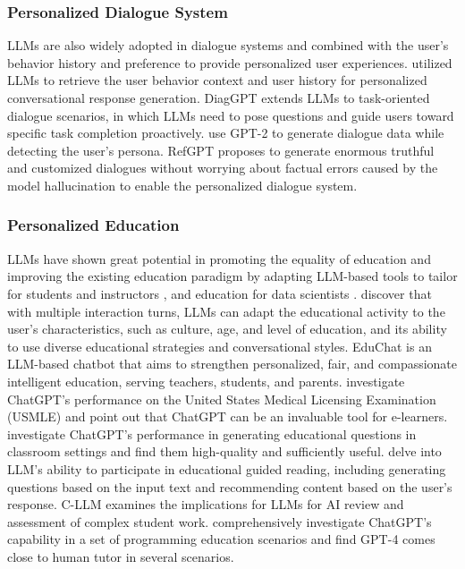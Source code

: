 \documentclass[11pt]{article}
\begin{document}
\subsubsection{Personalized Dialogue System}
LLMs are also widely adopted in dialogue systems and combined with the user's behavior history and preference to provide personalized user experiences.  
\citet{hudevcek2023llms} utilized LLMs to retrieve the user behavior context and user history for personalized conversational response generation.
DiagGPT \cite{cao2023diaggpt} extends LLMs to task-oriented dialogue scenarios, in which LLMs need to pose questions and guide users toward specific task completion proactively.
\citet{cho2022personalized} use GPT-2 to generate dialogue data while detecting the user's persona. 
 RefGPT \cite{yang2023refgpt} proposes to generate enormous truthful and customized dialogues without worrying about factual errors caused by the model hallucination to enable the personalized dialogue system.


\subsubsection{Personalized Education}
\label{sec:per_edu}
LLMs have shown great potential in promoting the equality of education and improving the existing education paradigm by adapting LLM-based tools to tailor for students and instructors \cite{joshi2023let, yan2023practical}, and education for data scientists \cite{tu2023should}. \citet{koyuturk2023developing} discover that with multiple interaction turns, LLMs can adapt the educational activity to the user's characteristics, such as culture, age, and level of education, and its ability to use diverse educational strategies and conversational styles. EduChat \cite{dan2023educhat} is an LLM-based chatbot that aims to strengthen personalized, fair, and compassionate intelligent education, serving teachers, students, and parents. \citet{sharma2023performance} investigate ChatGPT's performance on the United States Medical Licensing Examination (USMLE) and point out that ChatGPT can be an invaluable tool for e-learners. \citet{elkins2023useful} investigate ChatGPT's performance in generating educational questions in classroom settings and find them high-quality and sufficiently useful. \citet{ochieng2023large} delve into LLM's ability to participate in educational guided reading, including generating questions based on the input text and recommending content based on the user's response. C-LLM \cite{olga2023generative} examines the implications for LLMs for AI review and assessment of complex student work. 
\citet{phung2023generative} comprehensively investigate ChatGPT's capability in a set of programming education scenarios and find GPT-4 comes close to human tutor in several scenarios.
\end{document}
